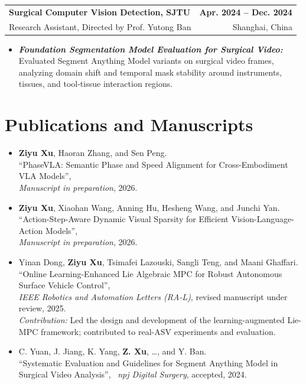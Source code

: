 \documentclass[11pt,letterpaper]{article}
\makeatletter
\newcommand{\resumeSubheading}[4]{
    \begin{tabularx}{\textwidth}{@{}Xr@{}}
        \textbf{#1} & \textbf{#2} \\
        #3 & #4 \\
    \end{tabularx}
}
\newcommand{\resumeItem}[1]{
    \item #1
}
\makeatother
\begin{document}
\resumeSubheading
{Surgical Computer Vision Detection, SJTU}
{Apr. 2024 -- Dec. 2024}
{Research Assistant, Directed by Prof. Yutong Ban}
{Shanghai, China}
\begin{itemize}[leftmargin=2.4em, itemsep=0.5pt, topsep=0pt]
    \small
    \resumeItem{\textbf{\textit{Foundation Segmentation Model Evaluation for Surgical Video:}} Evaluated Segment Anything Model variants on surgical video frames, analyzing domain shift and temporal mask stability around instruments, tissues, and tool-tissue interaction regions.}
\end{itemize}

\section*{Publications and Manuscripts}

\begin{itemize}[leftmargin=1.4em, itemsep=3pt, topsep=2pt]
    \item \textbf{Ziyu Xu}, Haoran Zhang, and Sen Peng. \\
    ``PhaseVLA: Semantic Phase and Speed Alignment for Cross-Embodiment VLA Models'', \\
    \textit{Manuscript in preparation}, 2026.
    \item \textbf{Ziyu Xu}, Xiaohan Wang, Anning Hu, Hesheng Wang, and Junchi Yan. \\
    ``Action-Step-Aware Dynamic Visual Sparsity for Efficient Vision-Language-Action Models'', \\
    \textit{Manuscript in preparation}, 2026.
    \item Yinan Dong, \textbf{Ziyu Xu}, Tsimafei Lazouski, Sangli Teng, and Maani Ghaffari. \\
    ``Online Learning-Enhanced Lie Algebraic MPC for Robust Autonomous Surface Vehicle Control'', \\
    \textit{IEEE Robotics and Automation Letters (RA-L)}, revised manuscript under review, 2025. \\
    \textit{Contribution:} Led the design and development of the learning-augmented Lie-MPC framework; contributed to real-ASV experiments and evaluation.
    \item C. Yuan, J. Jiang, K. Yang, \textbf{Z. Xu}, \ldots, and Y. Ban. \\
    ``Systematic Evaluation and Guidelines for Segment Anything Model in Surgical Video Analysis'', \
    \textit{npj Digital Surgery}, accepted, 2024.
    
\end{itemize}
\end{document}
